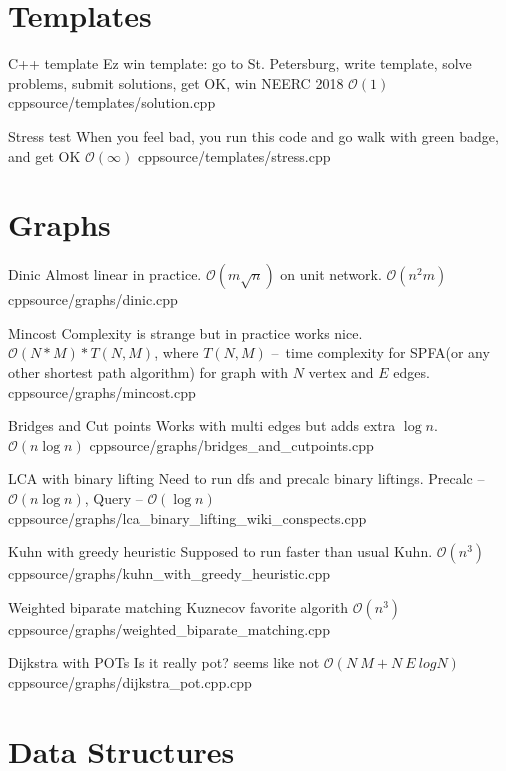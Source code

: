 \documentclass[landscape, 10pt, a4paper, oneside, twocolumn]{extarticle}
\begin{document}
\maketitlepage


\section{Templates}

\Algorithm
{C++ template}
{Ez win template: go to St. Petersburg, write template, solve problems, submit solutions, get OK, win NEERC 2018}
{$\mathcal{O}(1)$}
{cpp}{source/templates/solution.cpp}

\Algorithm
{Stress test}
{When you feel bad, you run this code and go walk with green badge, and get OK}
{$\mathcal{O}(\infty)$}
{cpp}{source/templates/stress.cpp}

\section{Graphs}

\Algorithm
{Dinic}
{Almost linear in practice. $\mathcal{O}(m \sqrt n)$ on unit network.}
{$\mathcal{O}(n^{2}m)$}
{cpp}{source/graphs/dinic.cpp}

\Algorithm
{Mincost}
{Complexity is strange but in practice works nice.}
{$\mathcal{O}(N * M) * T(N, M)$, where $T(N, M)$ – time complexity for SPFA(or any other shortest path algorithm) for graph with $N$ vertex and $E$ edges.}
{cpp}{source/graphs/mincost.cpp}

\Algorithm
{Bridges and Cut points}
{Works with multi edges but adds extra $ \log n$.}
{$\mathcal{O}(n \log n)$}
{cpp}{source/graphs/bridges_and_cutpoints.cpp}

\Algorithm
{LCA with binary lifting}
{Need to run dfs and precalc binary liftings.}
{Precalc – $\mathcal{O}(n \log n)$, Query – $\mathcal{O}(\log n)$}
{cpp}{source/graphs/lca_binary_lifting_wiki_conspects.cpp}

\Algorithm
{Kuhn with greedy heuristic}
{Supposed to run faster than usual Kuhn.}
{$\mathcal{O}(n^{3})$}
{cpp}{source/graphs/kuhn_with_greedy_heuristic.cpp}

\Algorithm
{Weighted biparate matching}
{Kuznecov favorite algorith}
{$\mathcal{O}(n^{3})$}
{cpp}{source/graphs/weighted_biparate_matching.cpp}

\Algorithm
{Dijkstra with POTs}
{Is it really pot? seems like not}
{$\mathcal{O}(N\ M + N\ E\ logN)$}
{cpp}{source/graphs/dijkstra_pot.cpp.cpp}


\section{Data Structures}
\end{document}
